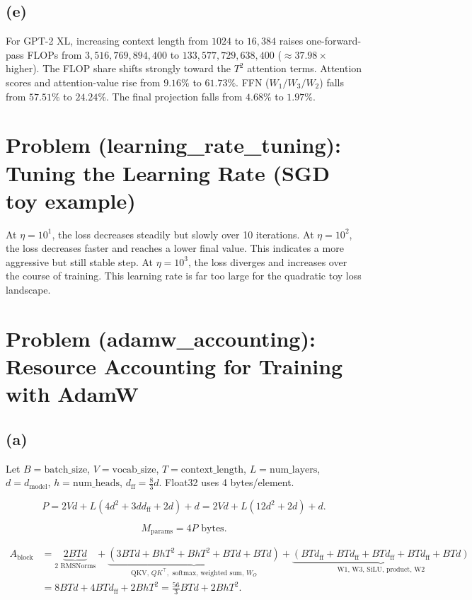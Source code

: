 \documentclass[11pt]{article}
\begin{document}
\subsection*{(e)}
For GPT-2 XL, increasing context length from \(1024\) to \(16{,}384\) raises one-forward-pass FLOPs from \(3{,}516{,}769{,}894{,}400\) to \(133{,}577{,}729{,}638{,}400\) ($\approx $\(37.98\times\) higher). The FLOP share shifts strongly toward the \(T^2\) attention terms. Attention scores and attention-value rise from \(9.16\%\) to \(61.73\%\). FFN (\(W_1/W_3/W_2\)) falls from \(57.51\%\) to \(24.24\%\). The final projection falls from \(4.68\%\) to \(1.97\%\).

\section{Problem (learning\_rate\_tuning): Tuning the Learning Rate (SGD toy example)}
At \(\eta=10^1\), the loss decreases steadily but slowly over 10 iterations. At \(\eta=10^2\), the loss decreases faster and reaches a lower final value. This indicates a more aggressive but still stable step. At \(\eta=10^3\), the loss diverges and increases over the course of training. This learning rate is far too large for the quadratic toy loss landscape.

\section{Problem (adamw\_accounting): Resource Accounting for Training with AdamW}
\subsection*{(a)}
Let \(B=\text{batch\_size}\), \(V=\text{vocab\_size}\), \(T=\text{context\_length}\), \(L=\text{num\_layers}\), \(d=d_{\text{model}}\), \(h=\text{num\_heads}\), \(d_{\text{ff}}=\frac{8}{3}d\). Float32 uses 4 bytes/element.

\[
P = 2Vd + L\!\left(4d^2 + 3dd_{\text{ff}} + 2d\right) + d
= 2Vd + L(12d^2 + 2d) + d .
\]

\[
M_{\text{params}} = 4P \text{ bytes}.
\]


\[
\begin{aligned}
A_{\text{block}} &= \underbrace{2BTd}_{\text{2 RMSNorms}}
+ \underbrace{(3BTd + BhT^2 + BhT^2 + BTd + BTd)}_{\text{QKV, }QK^\top,\text{ softmax, weighted sum, }W_O}
+ \underbrace{(BTd_{\text{ff}} + BTd_{\text{ff}} + BTd_{\text{ff}} + BTd_{\text{ff}} + BTd)}_{\text{W1, W3, SiLU, product, W2}} \\
&= 8BTd + 4BTd_{\text{ff}} + 2BhT^2
= \frac{56}{3}BTd + 2BhT^2 .
\end{aligned}
\]
\end{document}
